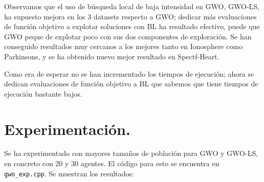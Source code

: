 \documentclass[11pt,a4paper]{article}
\theoremstyle{definition}
\begin{document}
	Observamos que el uso de búsqueda local de baja intensidad en GWO, GWO-LS, ha supuesto mejora en los 3 datasets respecto a GWO; dedicar más evaluaciones de función objetivo a explotar soluciones con BL ha resultado efectivo, puede que GWO peque de explotar poco con sus dos componentes de exploración. Se han conseguido resultados muy cercanos a los mejores tanto en Ionosphere como Parkinsons, y se ha obtenido nuevo mejor resultado en Spectf-Heart.
	
	
	
	Como era de esperar no se han incrementado los tiempos de ejecución; ahora se dedican evaluaciones de función objetivo a BL que sabemos que tiene tiempos de ejecución bastante bajos.
	
	\section{Experimentación.}
	Se ha experimentado con mayores tamaños de población para GWO y GWO-LS, en concreto con 20 y 30 agentes. El código para esto se encuentra en \texttt{gwo\_exp.cpp}. Se muestran los resultados:
	
\end{document}
